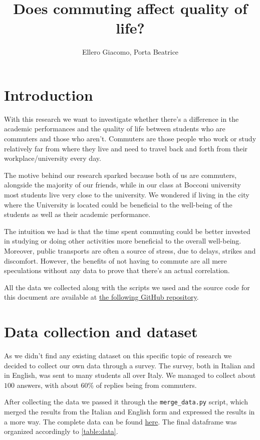 \documentclass[11pt]{extarticle}
\title{\vspace{-1.5cm}Does commuting affect quality of life?\vspace{-0.5cm}}
\author{Ellero Giacomo, Porta Beatrice}
\date{}
\numberwithin{table}{section}
\numberwithin{figure}{section}
\numberwithin{equation}{section}
\begin{document}
\maketitle
\vspace{-1cm}

\section{Introduction}

With this research we want to investigate whether there’s a difference in the academic performances
and the quality of life between students who are commuters and those who aren't.
Commuters are those people who work or study relatively far from where they live
and need to travel back and forth from their workplace/university every day.

The motive behind our research sparked because both of us are commuters,
alongside the majority of our friends, while in our class at Bocconi university most students
live very close to the university.
We wondered if living in the city where the University is located could be beneficial
to the well-being of the students as well as their academic performance.

The intuition we had is that the time spent commuting could be better invested in studying
or doing other activities more beneficial to the overall well-being.
Moreover, public transports are often a source of stress, due to delays, strikes and discomfort.
However, the benefits of not having to commute are all mere speculations without any data to prove
that there’s an actual correlation.

All the data we collected along with the scripts we used and the source code for this document
are available at
\href{https://github.com/billy4479/stats-research-project}{the following GitHub repository}.

\section{Data collection and dataset}

As we didn't find any existing dataset on this specific topic of research we decided
to collect our own data through a survey.
The survey, both in Italian and in English, was sent to many students all over Italy.
We managed to collect about $100$ answers, with about $60\%$ of replies being from commuters.

After collecting the data we passed it through the \texttt{merge\_data.py} script,
which merged the results from the Italian and English form and expressed the results in a more
 way.
The complete data can be found
\href{https://github.com/billy4479/stats-research-project/blob/master/data/merged.csv}{here}.
The final dataframe was organized accordingly to \cref{table:data}.
\end{document}
